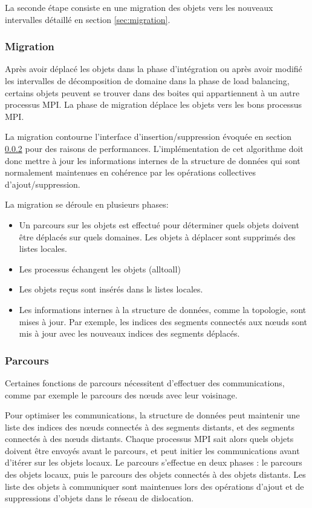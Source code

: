 La seconde étape consiste en une migration des objets vers les nouveaux intervalles détaillé en section \ref{sec:migration}.

\subsubsection{Migration}

Après avoir déplacé les objets dans la phase d'intégration ou après avoir modifié les intervalles de décomposition de domaine dans la phase de load balancing, certains objets peuvent se trouver dans des boites qui appartiennent à un autre processus MPI. La phase de migration déplace les objets vers les bons processus MPI. 

La migration contourne l'interface d'insertion/suppression évoquée en section \ref{} pour des raisons de performances. L'implémentation de cet algorithme doit donc mettre à jour les informations internes de la structure de données qui sont normalement maintenues en cohérence par les opérations collectives d'ajout/suppression.

La migration se déroule en plusieurs phases:
\begin{itemize}
	\item Un parcours sur les objets est effectué pour déterminer quels objets doivent être déplacés sur quels domaines. Les objets à déplacer sont supprimés des listes locales.
	\item Les processus échangent les objets (alltoall)
	\item Les objets reçus sont insérés dans ls listes locales.
	\item Les informations internes à la structure de données, comme la topologie, sont mises à jour. Par exemple, les indices des segments connectés aux nœuds sont mis à jour avec les nouveaux indices des segments déplacés.
\end{itemize}


\subsubsection{Parcours}

Certaines fonctions de parcours nécessitent d'effectuer des communications, comme par exemple le parcours des nœuds avec leur voisinage.

Pour optimiser les communications, la structure de données peut maintenir une liste des indices des nœuds connectés à des segments distants, et des segments connectés à des nœuds distants. Chaque processus MPI sait alors quels objets doivent être envoyés avant le parcours, et peut initier les communications avant d'itérer sur les objets locaux. Le parcours s'effectue en deux phases : le parcours des objets locaux, puis le parcours des objets connectés à des objets distants. Les liste des objets à communiquer sont maintenues lors des opérations d'ajout et de suppressions d'objets dans le réseau de dislocation.

